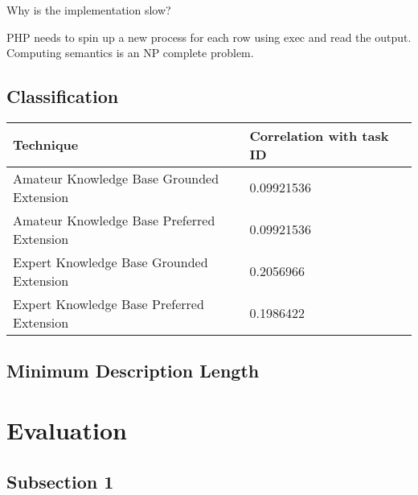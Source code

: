 Why is the implementation slow?

PHP needs to spin up a new process for each row using exec and read the output.
Computing semantics is an NP complete problem.


\subsection{Classification}


\begin{center}
    \begin{tabular}{ | l | l | l |}
    \hline
    Technique & Correlation with task ID \\ \hline
    Amateur Knowledge Base Grounded Extension & 0.09921536\\ \hline
    Amateur Knowledge Base Preferred Extension & 0.09921536\\ \hline
    Expert Knowledge Base Grounded Extension & 0.2056966\\ \hline
    Expert Knowledge Base Preferred Extension & 0.1986422\\ \hline
    \end{tabular}
\end{center}

\subsection{Minimum Description Length}




\section{Evaluation}





\subsection{Subsection 1}

